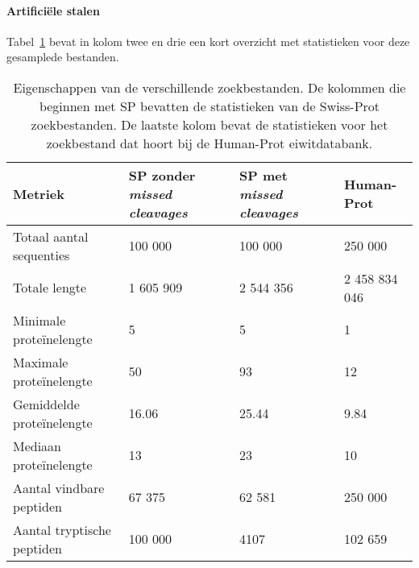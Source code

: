 \paragraph{Artificiële stalen}
Tabel~\ref{tab:artifiele_bestanden_statistieken} bevat in kolom twee en drie een kort overzicht met statistieken voor deze gesamplede bestanden.

\begin{table}[H]
    \hspace*{-0.35cm} %
    \begin{tabular}{l l l l}
        Metriek                    & SP zonder \textit{missed cleavages} & SP met \textit{missed cleavages} & Human-Prot    \\
        \hline\hline
        Totaal aantal sequenties   & 100 000                             & 100 000                          & 250 000       \\
        Totale lengte              & 1 605 909                           & 2 544 356                        & 2 458 834 046 \\
        Minimale proteïnelengte    & 5                                   & 5                                & 1             \\
        Maximale proteïnelengte    & 50                                  & 93                               & 12            \\
        Gemiddelde proteïnelengte  & 16.06                               & 25.44                            & 9.84          \\
        Mediaan proteïnelengte     & 13                                  & 23                               & 10            \\
        Aantal vindbare peptiden   & 67 375                              & 62 581                           & 250 000       \\
        Aantal tryptische peptiden & 100 000                             & 4107                             & 102 659       \\
        \hline
    \end{tabular}
    \caption{Eigenschappen van de verschillende zoekbestanden. De kolommen die beginnen met SP bevatten de statistieken van de Swiss-Prot zoekbestanden. De laatste kolom bevat de statistieken voor het zoekbestand dat hoort bij de Human-Prot eiwitdatabank.}
    \label{tab:artifiele_bestanden_statistieken}
\end{table}

